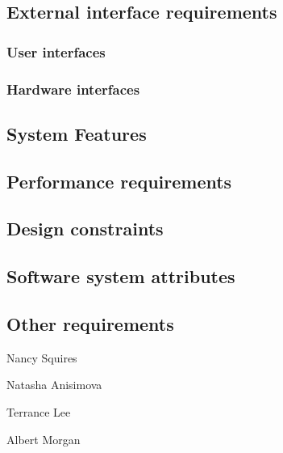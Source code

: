 \documentclass[10pt,journal,draftclsnofoot,onecolumn]{IEEEtran}
\begin{document}
	\subsection{External interface requirements}
	\subsubsection{User interfaces}
	\subsubsection{Hardware interfaces}

	\subsection{System Features}	
	\subsection{Performance requirements}
	\subsection{Design constraints}
	\subsection{Software system attributes}
	\subsection{Other requirements}




	\vspace{1in}
	\noindent Nancy Squires

	\vspace{1in}
	\noindent Natasha Anisimova

	\vspace{1in}
	\noindent Terrance Lee

	\vspace{1in}
	\noindent Albert Morgan\\
	
\end{document}
